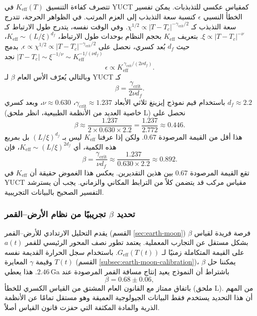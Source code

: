 \documentclass[11pt,a4paper]{article}
\begin{document}
	تتصرف كفاءة التنسيق $K_{\mathrm{eff}}(T)$ في YUCT كمقياس عكسي للتذبذبات. يمكن تفسير الخطأ النسبي $\epsilon$ كنسبة سعة التذبذب إلى العزم المرتب. في الظواهر الحرجة، تتدرج سعة التذبذب كـ $\chi^{1/2} \propto |T - T_c|^{-\gamma_{\mathrm{crit}}/2}$. وفي الوقت نفسه، يتدرج طول الارتباط كـ $\xi \propto |T - T_c|^{-\nu}$. بتعريف $K_{\mathrm{eff}}$ بحجم النظام بوحدات طول الارتباط، $K_{\mathrm{eff}} \sim (L/\xi)^{d_f}$، حيث $d_f$ بُعد كسري، نحصل على $\epsilon \propto \chi^{1/2} \propto |T - T_c|^{-\gamma_{\mathrm{crit}}/2}$. بدمج $|T - T_c| \sim \xi^{-1/\nu} \sim K_{\mathrm{eff}}^{-1/(\nu d_f)}$ نجد
	\[
	\epsilon \propto K_{\mathrm{eff}}^{\,\gamma_{\mathrm{crit}}/(2\nu d_f)}.
	\]
	وبالتالي يُعرّف الأس العام $\beta$ لـ YUCT كـ
	\begin{equation}
		\label{eq:beta-from-critical}
		\beta = \frac{\gamma_{\mathrm{crit}}}{2\nu d_f}.
	\end{equation}
	باستخدام قيم نموذج إيزينغ ثلاثي الأبعاد $\gamma_{\mathrm{crit}} \approx 1.237$، $\nu \approx 0.630$، وبعد كسري $d_f \approx 2.2$ (خاصية العديد من الأنظمة الطبيعية، انظر ملحق L) نحصل على
	\[
	\beta \approx \frac{1.237}{2 \times 0.630 \times 2.2} = \frac{1.237}{2.772} \approx 0.446.
	\]
	هذا أقل من القيمة المرصودة 0.67. ولكن إذا عرفنا $K_{\mathrm{eff}}$ ليس بـ $(L/\xi)^{d_f}$ بل بمربع هذه الكمية، أي $K_{\mathrm{eff}} \sim (L/\xi)^{2d_f}$، فإن
	\[
	\beta = \frac{\gamma_{\mathrm{crit}}}{\nu d_f} \approx \frac{1.237}{0.630 \times 2.2} \approx 0.892.
	\]
	تقع القيمة المرصودة 0.67 بين هذين التقديرين. يعكس هذا الغموض حقيقة أن $K_{\mathrm{eff}}$ في YUCT مقياس مركب قد يتضمن كلاً من الترابط المكاني والزماني. يجب أن يسترشد التفسير الصحيح بالبيانات التجريبية.
	
	\subsubsection{تحديد $\beta$ تجريبيًا من نظام الأرض–القمر}
	يقدم التحليل الارتدادي للأرض–القمر (القسم \ref{sec:earth-moon}) فرصة فريدة لقياس $\beta$ بشكل مستقل عن التجارب المعملية. يعتمد تطور نصف المحور الرئيسي للقمر $a(t)$ على القيمة المتكاملة زمنيًا لـ $G_{\mathrm{eff}}(T(t))$. باستخدام سجل الحرارة القديمة نفسه $T(t)$ وقيمة $\gamma$ المعايرة (القسم \ref{subsec:earth-moon-calibration})، يمكننا حل $\beta$ باشتراط أن النموذج يعيد إنتاج مسافة القمر المرصودة عند $2.46\,\mathrm{Ga}$. هذا يعطي
	\[
	\beta = 0.68 \pm 0.06,
	\]
	باتفاق ممتاز مع القانون العام المشتق من القياس الكسري للخطأ (ملحق L). من المهم أن هذا التحديد يستخدم فقط البيانات الجيولوجية العميقة وهو مستقل تمامًا عن الأنظمة الذرية والمادة المكثفة التي حفزت قانون القياس أصلاً.
	
\end{document}

